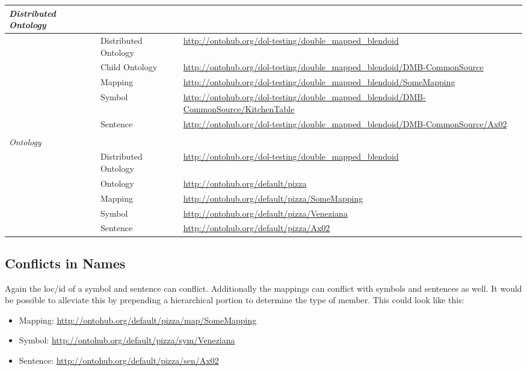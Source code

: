 \documentclass[a4paper,11pt,DIV=25]{scrartcl}
\begin{document}
\begin{tabularx}{\textwidth}{p{}p{}p{}}
  \textit{Distributed Ontology} & & \\
  \hline
  & Distributed Ontology & \url{http://ontohub.org/dol-testing/double_mapped_blendoid}\\
  & Child Ontology & \url{http://ontohub.org/dol-testing/double_mapped_blendoid/DMB-CommonSource}\\
  & Mapping & \url{http://ontohub.org/dol-testing/double_mapped_blendoid/SomeMapping}\\
  & Symbol & \url{http://ontohub.org/dol-testing/double_mapped_blendoid/DMB-CommonSource/KitchenTable}\\
  & Sentence & \url{http://ontohub.org/dol-testing/double_mapped_blendoid/DMB-CommonSource/Ax02}\\
  & & \\
  \textit{Ontology} & & \\
  \hline
  & Distributed Ontology & \url{http://ontohub.org/dol-testing/double_mapped_blendoid}\\
  & Ontology & \url{http://ontohub.org/default/pizza}\\
  & Mapping & \url{http://ontohub.org/default/pizza/SomeMapping}\\
  & Symbol & \url{http://ontohub.org/default/pizza/Veneziana}\\
  & Sentence & \url{http://ontohub.org/default/pizza/Ax02}\\
\end{tabularx}

\subsection{Conflicts in Names}

Again the loc/id of a symbol and sentence can conflict. Additionally the
mappings can conflict with symbols and sentences as well. It would be possible
to alleviate this by prepending a hierarchical portion to determine the type of
member. This could look like this:

\begin{itemize}
  \item Mapping: \url{http://ontohub.org/default/pizza/map/SomeMapping}
  \item Symbol: \url{http://ontohub.org/default/pizza/sym/Veneziana}
  \item Sentence: \url{http://ontohub.org/default/pizza/sen/Ax02}
\end{itemize}
\end{document}
